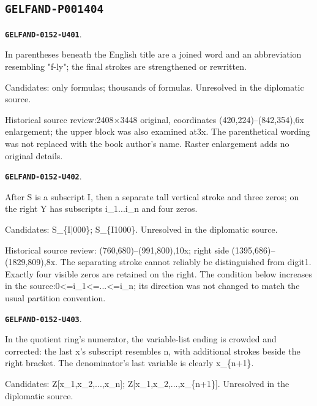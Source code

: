 \documentclass[11pt]{article}
\theoremstyle{definition}
\theoremstyle{remark}
\begin{document}
\subsection*{\texttt{GELFAND-P001404}}
\par\noindent\leavevmode{}\label{GELFAND-0152-U401}\label{GELFAND-P001404:book-parenthesis:note}\textbf{\texttt{GELFAND-0152-U401}}.\nopagebreak[4]\par
In parentheses beneath the English title are a joined word and an abbreviation resembling "f-ly"; the final strokes are strengthened or rewritten.\par
Candidates: only formulas; thousands of formulas. Unresolved in the diplomatic source.\par
Historical source review:2408×3448 original, coordinates (420,224)–(842,354),6x enlargement; the upper block was also examined at3x. The parenthetical wording was not replaced with the book author's name. Raster enlargement adds no original details.\par\medskip
\par\noindent\leavevmode{}\label{GELFAND-0152-U402}\label{GELFAND-P001404:theorem25-left-index:note}\textbf{\texttt{GELFAND-0152-U402}}.\nopagebreak[4]\par
After S is a subscript I, then a separate tall vertical stroke and three zeros; on the right Y has subscripts i\_1...i\_n and four zeros.\par
Candidates: S\_\{I|000\}; S\_\{I1000\}. Unresolved in the diplomatic source.\par
Historical source review: (760,680)–(991,800),10x; right side (1395,686)–(1829,809),8x. The separating stroke cannot reliably be distinguished from digit1. Exactly four visible zeros are retained on the right. The condition below increases in the source:0<=i\_1<=...<=i\_n; its direction was not changed to match the usual partition convention.\par\medskip
\par\noindent\leavevmode{}\label{GELFAND-0152-U403}\label{GELFAND-P001404:finite26-left:note}\textbf{\texttt{GELFAND-0152-U403}}.\nopagebreak[4]\par
In the quotient ring's numerator, the variable-list ending is crowded and corrected: the last x's subscript resembles n, with additional strokes beside the right bracket. The denominator's last variable is clearly x\_\{n+1\}.\par
Candidates: Z[x\_1,x\_2,...,x\_n]; Z[x\_1,x\_2,...,x\_\{n+1\}]. Unresolved in the diplomatic source.\par
\end{document}
